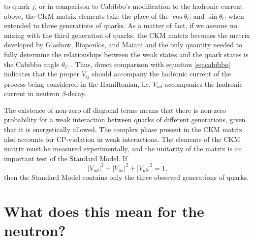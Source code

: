 to quark $j$, or in comparison to Cabibbo's modification to the hadronic current
above, the CKM matrix elements take the place of the $\cos\theta_C$ and $\sin\theta_C$
when extended to three generations of quarks. As a matter of fact, if we assume no mixing
with the third generation of quarks, the CKM matrix becomes the matrix developed by
Glashow, Iliopoulos, and Maiani and the only quantity needed to fully determine
the relationships between the weak states and the quark states is the Cabibbo angle $\theta_C$
\cite{griffiths2008}.
Thus, direct comparison with equation \ref{eq:cabibbo} indicates that the proper
$V_{ij}$ should accompany the hadronic current
of the process being considered in the Hamiltonian, i.e. $V_{ud}$ accompanies the hadronic
current in neutron $\beta$-decay.

The existence of non-zero off diagonal terms means that there is non-zero probability for a
weak interaction between quarks of different generations, given that it is energetically
allowed. The complex phase present in the CKM
matrix also accounts for CP-violation in weak interactions.
The elements of the CKM matrix must be measured experimentally, and the unitarity of the matrix
is an important test of the Standard Model. If
%
\begin{equation}
  |V_{ud}|^2 + |V_{us}|^2 + |V_{ub}|^2 = 1,
\end{equation}
then the Standard Model contains only the three observed generations of quarks.


\section{What does this mean for the neutron?}

